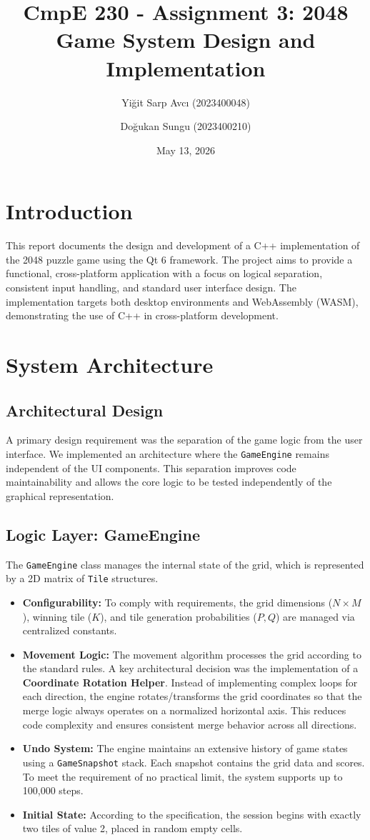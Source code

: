 \documentclass[11pt,a4paper]{article}
\title{CmpE 230 - Assignment 3: 2048 Game System Design and Implementation}
\author{Yi\u{g}it Sarp Avc\i{} (2023400048) \and Do\u{g}ukan Sungu (2023400210)}
\date{May 13, 2026}
\begin{document}
\maketitle

\section{Introduction}
This report documents the design and development of a C++ implementation of the 2048 puzzle game using the Qt 6 framework. The project aims to provide a functional, cross-platform application with a focus on logical separation, consistent input handling, and standard user interface design. The implementation targets both desktop environments and WebAssembly (WASM), demonstrating the use of C++ in cross-platform development.

\section{System Architecture}

\subsection{Architectural Design}
A primary design requirement was the separation of the game logic from the user interface. We implemented an architecture where the \texttt{GameEngine} remains independent of the UI components. This separation improves code maintainability and allows the core logic to be tested independently of the graphical representation.

\subsection{Logic Layer: GameEngine}
The \texttt{GameEngine} class manages the internal state of the grid, which is represented by a 2D matrix of \texttt{Tile} structures.
\begin{itemize}
    \item \textbf{Configurability:} To comply with requirements, the grid dimensions ($N \times M$), winning tile ($K$), and tile generation probabilities ($P, Q$) are managed via centralized constants.
    \item \textbf{Movement Logic:} The movement algorithm processes the grid according to the standard rules. A key architectural decision was the implementation of a \textbf{Coordinate Rotation Helper}. Instead of implementing complex loops for each direction, the engine rotates/transforms the grid coordinates so that the merge logic always operates on a normalized horizontal axis. This reduces code complexity and ensures consistent merge behavior across all directions.
    \item \textbf{Undo System:} The engine maintains an extensive history of game states using a \texttt{GameSnapshot} stack. Each snapshot contains the grid data and scores. To meet the requirement of no practical limit, the system supports up to 100,000 steps.
    \item \textbf{Initial State:} According to the specification, the session begins with exactly two tiles of value 2, placed in random empty cells.
\end{itemize}
\end{document}
